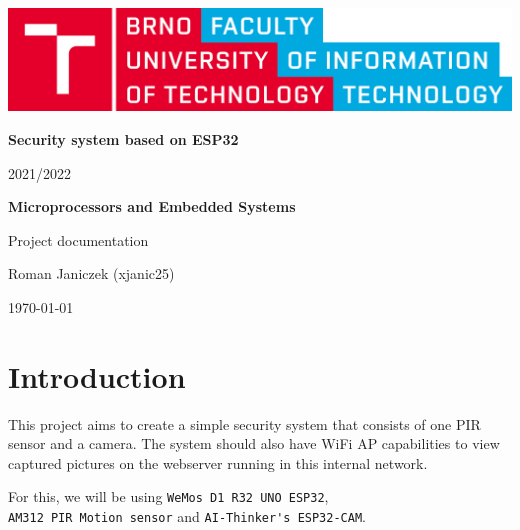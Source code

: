 \documentclass{article}
\begin{document}
    \begin{titlepage}
        \centering
        \includegraphics[scale=0.1,keepaspectratio]{img/logo_en.png}
        \vspace{5cm}
        
        {\textbf{\Huge Security system based on ESP32}}
        
        \vspace{0.25cm}
        {\LARGE 2021/2022}
        \vspace{1cm}
        
        {\textbf{\LARGE Microprocessors and Embedded Systems}}
        \vspace{0.25cm}
        
        
        {\LARGE Project documentation}
        \vspace{1cm}
        
        {\Large Roman Janiczek (xjanic25)}
        
        \vspace{1cm}
        {\large \today}
    
    \end{titlepage}
    
    \newpage
    
    \clearpage
    \tableofcontents
    \thispagestyle{empty}
    \clearpage
    \setcounter{page}{1}
    
    \section{Introduction}
    This project aims to create a simple security system that 
    consists of one PIR sensor and a camera. The system should also
    have WiFi AP capabilities to view captured pictures on the 
    webserver running in this internal network.
    
    For this, we will be using \verb|WeMos D1 R32 UNO ESP32|,    \\
    \verb|AM312 PIR Motion sensor| and \verb|AI-Thinker's ESP32-CAM|.
    
\end{document}
